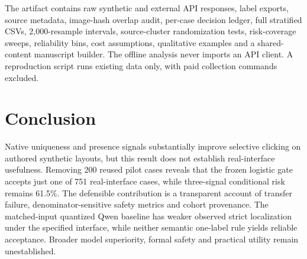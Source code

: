 \documentclass[10pt]{article}
\begin{document}
The artifact contains raw synthetic and external API responses, label exports, source metadata, image-hash overlap audit, per-case decision ledger, full stratified CSVs, 2,000-resample intervals, source-cluster randomization tests, risk-coverage sweeps, reliability bins, cost assumptions, qualitative examples and a shared-content manuscript builder. The offline analysis never imports an API client. A reproduction script runs existing data only, with paid collection commands excluded.

\section{Conclusion}
Native uniqueness and presence signals substantially improve selective clicking on authored synthetic layouts, but this result does not establish real-interface usefulness. Removing 200 reused pilot cases reveals that the frozen logistic gate accepts just one of 751 real-interface cases, while three-signal conditional risk remains 61.5\%. The defensible contribution is a transparent account of transfer failure, denominator-sensitive safety metrics and cohort provenance. The matched-input quantized Qwen baseline has weaker observed strict localization under the specified interface, while neither semantic one-label rule yields reliable acceptance. Broader model superiority, formal safety and practical utility remain unestablished.
\end{document}
